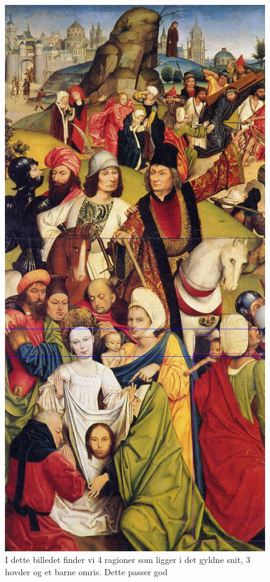 \begin{figure}[h!!]
	\begin{center}
		\includegraphics[scale=0.35,angle=0]{afsnit/afprovning/billeder/BBCarruingcut2.png}
	\end{center}
	\caption[]{I dette billedet finder vi 4 ragioner som ligger i det
	           gyldne snit, 3 hovder og et barne omris. Dette passer god}
	\label{BBCarruingcut2}
\end{figure}

